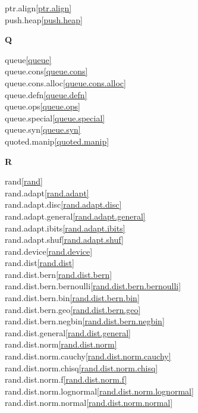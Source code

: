 \begin{multicols}{2}
ptr.align\quad\ref{ptr.align}\\
push.heap\quad\ref{push.heap}\\
\par \textbf{Q}\par
queue\quad\ref{queue}\\
queue.cons\quad\ref{queue.cons}\\
queue.cons.alloc\quad\ref{queue.cons.alloc}\\
queue.defn\quad\ref{queue.defn}\\
queue.ops\quad\ref{queue.ops}\\
queue.special\quad\ref{queue.special}\\
queue.syn\quad\ref{queue.syn}\\
quoted.manip\quad\ref{quoted.manip}\\
\par \textbf{R}\par
rand\quad\ref{rand}\\
rand.adapt\quad\ref{rand.adapt}\\
rand.adapt.disc\quad\ref{rand.adapt.disc}\\
rand.adapt.general\quad\ref{rand.adapt.general}\\
rand.adapt.ibits\quad\ref{rand.adapt.ibits}\\
rand.adapt.shuf\quad\ref{rand.adapt.shuf}\\
rand.device\quad\ref{rand.device}\\
rand.dist\quad\ref{rand.dist}\\
rand.dist.bern\quad\ref{rand.dist.bern}\\
rand.dist.bern.bernoulli\quad\ref{rand.dist.bern.bernoulli}\\
rand.dist.bern.bin\quad\ref{rand.dist.bern.bin}\\
rand.dist.bern.geo\quad\ref{rand.dist.bern.geo}\\
rand.dist.bern.negbin\quad\ref{rand.dist.bern.negbin}\\
rand.dist.general\quad\ref{rand.dist.general}\\
rand.dist.norm\quad\ref{rand.dist.norm}\\
rand.dist.norm.cauchy\quad\ref{rand.dist.norm.cauchy}\\
rand.dist.norm.chisq\quad\ref{rand.dist.norm.chisq}\\
rand.dist.norm.f\quad\ref{rand.dist.norm.f}\\
rand.dist.norm.lognormal\quad\ref{rand.dist.norm.lognormal}\\
rand.dist.norm.normal\quad\ref{rand.dist.norm.normal}\\

\end{multicols}
